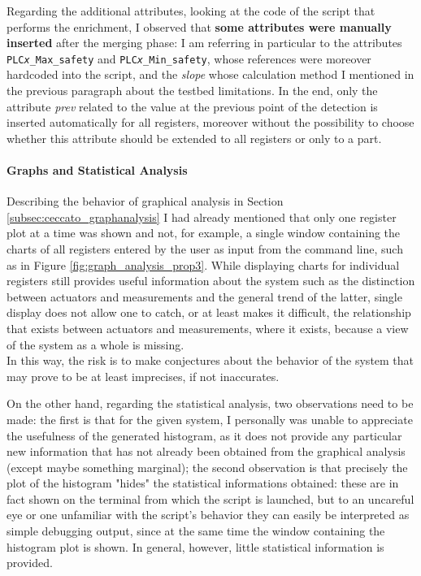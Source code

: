 \bigskip
Regarding the additional attributes, looking at the code of the script that performs the enrichment, I observed that \textbf{some attributes were manually inserted} after the merging phase: I am referring in particular to the attributes \texttt{PLC\textit{x}\_Max\_safety} and \texttt{PLC\textit{x}\_Min\_safety}, whose references were moreover hardcoded into the script, and the \textit{slope} whose calculation method I mentioned in the previous paragraph about the testbed limitations.\newline
In the end, only the attribute \textit{prev} related to the value at the previous point of the detection is inserted automatically for all registers, moreover without the possibility to choose whether this attribute should be extended to all registers or only to a part.

\paragraph{Graphs and Statistical Analysis}
Describing the behavior of graphical analysis in Section \ref{subsec:ceccato_graphanalysis} I had already mentioned that only one register plot at a time was shown and not, for example, a single window containing the charts of all registers entered by the user as input from the command line, such as in Figure \ref{fig:graph_analysis_prop3}.\newline
While displaying charts for individual registers still provides useful information about the system such as the distinction between actuators and measurements and the general trend of the latter, single display does not allow one to catch, or at least makes it difficult, the relationship that exists between actuators and measurements, where it exists, because a view of the system as a whole is missing.\\
In this way, the risk is to make conjectures about the behavior of the system that may prove to be at least imprecises, if not inaccurates.

\bigskip
On the other hand, regarding the statistical analysis, two observations need to be made: the first is that for the given system, I personally was unable to appreciate the usefulness of the generated histogram, as it does not provide any particular new information that has not already been obtained from the graphical analysis (except maybe something marginal); the second observation is that precisely the plot of the histogram "hides" the statistical informations obtained: these are in fact shown on the terminal from which the script is launched, but to an uncareful eye or one unfamiliar with the script's behavior they can easily be interpreted as simple debugging output, since at the same time the window containing the histogram plot is shown. In general, however, little statistical information is provided.

